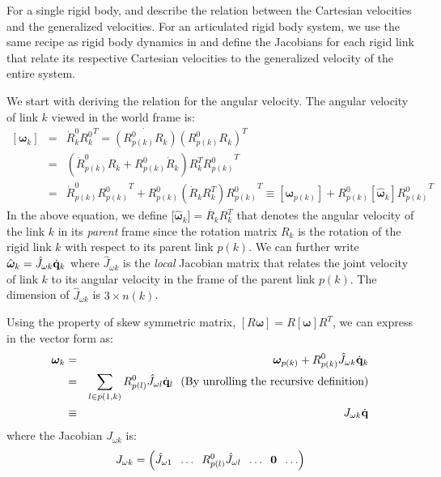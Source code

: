 For a single rigid body,  and  describe the relation between the Cartesian velocities and the generalized velocities. 
For an articulated rigid body system, we use the same recipe as rigid body dynamics in  and define the Jacobians for each rigid link that relate its respective Cartesian velocities to the generalized velocity of the entire system. 

We start with deriving the relation for the angular velocity. The angular velocity of link $k$ viewed in the world frame is:
\begin{eqnarray}
\nonumber
[\bm{\omega}_k] & = & \dot{R}^0_k {R^0_k}^T = \dot{(R^0_{p(k)}R_k)} (R^0_{p(k)}R_k)^T\\
\nonumber
& = & (\dot{R}^0_{p(k)}R_k + {R^0_{p(k)}}\dot{R}_k)  R_k^T {R^0_{p(k)}}^T \\
\label{eq:angvelk_recursive}
& = & \dot{R}^0_{p(k)}{R^0_{p(k)}}^T + R^0_{p(k)} \left ( \dot{R}_k R_k^T \right ) {R^0_{p(k)}}^T \equiv [\bm{\omega}_{p(k)}] + R^0_{p(k)} [\hat{\bm{\omega}}_k] {R^0_{p(k)}}^T
\end{eqnarray}
In the above equation, we define [$\hat{\bm{\omega}}_k] = \dot{R_k} R_k^T$ that denotes the angular velocity of the link $k$ in its \emph{parent} frame since the rotation matrix $R_k$ is the rotation of the rigid link $k$ with respect to its parent link $p(k)$. We can further write $\hat{\bm{\omega}}_k = \hat{J}_{\omega k} \dot{\mathbf{q}}_k$ where $\hat{J}_{\omega k}$ is the \emph{local} Jacobian matrix that relates the joint velocity of link $k$ to its angular velocity in the frame of the parent link $p(k)$. The dimension of $\hat{J}_{\omega k}$ is $3\times n(k)$. 

Using the property of skew symmetric matrix, $[R \bm{\omega}] = R [\bm{\omega}]
R^T$, we can express  in the vector form as:
\begin{eqnarray}
\label{eq:angvelk_iterative}
\nonumber
\bm{\omega}_k & = & \bm{\omega}_{p(k)} + R^0_{p(k)} \hat{J}_{\omega k} \dot{\mathbf{q}}_k\\
\nonumber
& = & \sum_{l \in p(1,k)} R^0_{p(l)} \hat{J}_{\omega l} \dot{\mathbf{q}}_l \mbox{\ \ (By unrolling the recursive definition)}\\
& \equiv & J_{\omega k}\dot{\mathbf{q}}
\end{eqnarray}
where the Jacobian $J_{\omega k}$ is:
\begin{equation}
\label{eq:angular_velocity_jac_link}
J_{\omega k} = \left ( \hat{J}_{\omega 1}\;\; \hdots\;\; R^0_{p(l)} \hat{J}_{\omega l} \;\;\hdots\;\; \mathbf{0} \;\;\hdots \right )
\end{equation}


